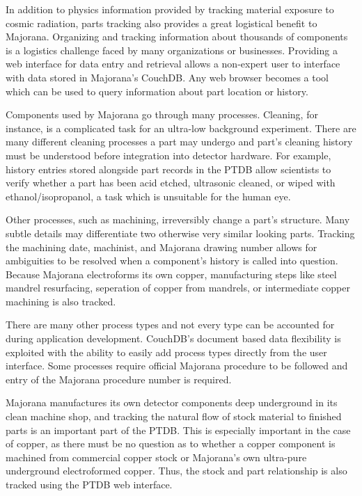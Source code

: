 \documentclass[journal]{IEEEtran}
\begin{document}
In addition to physics information provided by tracking material exposure to cosmic radiation, parts tracking also provides
a great logistical benefit to Majorana. Organizing and tracking information about thousands of components is a logistics
challenge faced by many organizations or businesses. Providing a web interface for data entry and retrieval allows
a non-expert user to interface with data stored in Majorana's CouchDB. Any web browser becomes a tool which can
be used to query information about part location or history.

Components used by Majorana go through many processes. Cleaning, for instance, is a complicated task for an ultra-low
background experiment. There are many different cleaning processes a part may undergo and part's cleaning history
must be understood before integration into detector hardware. For example, history entries stored alongside part records in the PTDB
allow scientists to verify whether a part has been acid etched, ultrasonic cleaned, or wiped with ethanol/isopropanol,
a task which is unsuitable for the human eye.

Other processes, such as machining, irreversibly change a part's structure. Many subtle details may differentiate
two otherwise very similar looking parts. Tracking the machining date, machinist, and Majorana drawing number allows
for ambiguities to be resolved when a component's history is called into question. Because Majorana electroforms its
own copper, manufacturing steps like steel mandrel resurfacing, seperation of copper from mandrels, or intermediate
copper machining is also tracked.

There are many other process types and not every type can
be accounted for during application development. CouchDB's document based data flexibility is exploited with the ability
to easily add process types directly from the user interface. Some processes require official Majorana procedure to be
followed and entry of the Majorana procedure number is required.

Majorana manufactures its own detector components deep underground in its clean machine shop, and tracking the natural
flow of stock material to finished parts is an important part of the PTDB. This is especially important in the case of
copper, as there must be no question as to whether a copper component is machined from commercial copper stock or
Majorana's own ultra-pure underground electroformed copper. Thus, the stock and part relationship is also tracked using
the PTDB web interface. 
\end{document}
